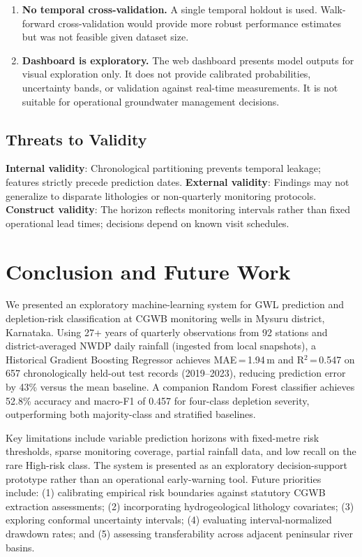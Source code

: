 \documentclass[conference]{IEEEtran}
\begin{document}
\begin{enumerate}
  \item \textbf{No temporal cross-validation.}
        A single temporal holdout is used.
        Walk-forward cross-validation would provide more robust
        performance estimates but was not feasible given dataset size.

  \item \textbf{Dashboard is exploratory.}
        The web dashboard presents model outputs for visual
        exploration only.
        It does not provide calibrated probabilities, uncertainty
        bands, or validation against real-time measurements.
        It is not suitable for operational groundwater management
        decisions.
\end{enumerate}

\subsection{Threats to Validity}

\textbf{Internal validity}: Chronological partitioning prevents temporal leakage; features strictly precede prediction dates.
\textbf{External validity}: Findings may not generalize to disparate lithologies or non-quarterly monitoring protocols.
\textbf{Construct validity}: The horizon reflects monitoring intervals rather than fixed operational lead times; decisions depend on known visit schedules.

\section{Conclusion and Future Work}
\label{sec:conclusion}

We presented an exploratory machine-learning system for GWL
prediction and depletion-risk classification at CGWB monitoring
wells in Mysuru district, Karnataka.
Using 27+ years of quarterly observations from 92 stations and
district-averaged NWDP daily rainfall (ingested from local snapshots),
a Historical Gradient Boosting Regressor achieves MAE\,=\,1.94\,m
and R$^2$\,=\,0.547 on 657 chronologically held-out test records
(2019--2023), reducing prediction error by 43\% versus the mean baseline.
A companion Random Forest classifier achieves 52.8\% accuracy and
macro-F1 of 0.457 for four-class depletion severity, outperforming
both majority-class and stratified baselines.

Key limitations include variable prediction horizons with
fixed-metre risk thresholds, sparse monitoring coverage, partial
rainfall data, and low recall on the rare High-risk class.
The system is presented as an exploratory decision-support
prototype rather than an operational early-warning tool.
Future priorities include: (1) calibrating empirical risk boundaries against statutory CGWB extraction assessments; (2) incorporating hydrogeological lithology covariates; (3) exploring conformal uncertainty intervals; (4) evaluating interval-normalized drawdown rates; and (5) assessing transferability across adjacent peninsular river basins.
\end{document}
